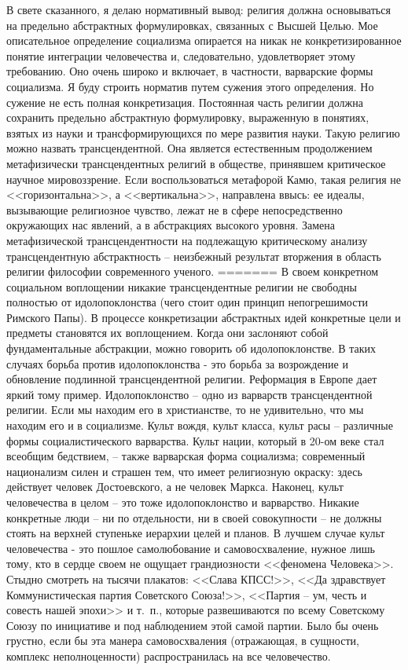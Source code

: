 \documentclass{book}
\begin{document}
В свете сказанного, я делаю нормативный вывод: религия должна основываться на предельно абстрактных формулиров­ках, связанных с Высшей Целью. Мое описательное определе­ние социализма опирается на никак не конкретизированное понятие интеграции человечества и, следовательно, удовлетво­ряет этому требованию. Оно очень широко и включает, в частности, варварские формы социализма. Я буду строить норматив путем сужения этого определения. Но сужение не есть полная конкретизация. Постоянная часть религии должна сохранить предельно абстрактную формулировку, выраженную в понятиях, взятых из науки и трансформирующихся по мере развития науки. Такую религию можно назвать трансцендентной. Она является естественным продолжением метафизически трансцендентных религий в обществе, принявшем критическое научное мировоззрение. Если воспользоваться метафорой Камю, такая религия не <<горизонтальна>>, а <<вертикальна>>, направле­на ввысь: ее идеалы, вызывающие религиозное чувство, лежат не в сфере непосредственно окружающих нас явлений, а в абстракциях высокого уровня. Замена метафизической транс­цендентности на подлежащую критическому анализу трансцендентную абстрактность -- неизбежный результат вторжения в область религии философии современного ученого.
=======
В своем конкретном социальном воплощении никакие транс­цендентные религии не свободны полностью от идолопоклонст­ва (чего стоит один принцип непогрешимости Римского Папы). В процессе конкретизации абстрактных идей конкретные цели и предметы становятся их воплощением. Когда они засло­няют собой фундаментальные абстракции, можно говорить об идолопоклонстве. В таких случаях борьба против идоло­поклонства - это борьба за возрождение и обновление подлин­ной трансцендентной религии. Реформация в Европе дает яркий тому пример. Идолопоклонство -- одно из варварств трансцен­дентной религии. Если мы находим его в христианстве, то не удивительно, что мы находим его и в социализме. Культ вождя, культ класса, культ расы -- различные формы социалистиче­ского варварства. Культ нации, который в 20-ом веке стал всеоб­щим бедствием, -- также варварская форма социализма; совре­менный национализм силен и страшен тем, что имеет религиоз­ную окраску: здесь действует человек Достоевского, а не чело­век Маркса. Наконец, культ 
человечества в целом -- это тоже идолопоклонство и варварство. Никакие конкретные люди -- ни по отдельности, ни в своей совокупности -- не должны стоять на верхней ступеньке иерархии целей и планов. В лучшем слу­чае культ человечества - это пошлое самолюбование и само­восхваление, нужное лишь тому, кто в сердце своем не ощуща­ет грандиозности <<феномена Человека>>. Стыдно смотреть на тысячи плакатов: <<Слава КПСС!>>, <<Да здравствует Коммуни­стическая партия Советского Союза!>>, <<Партия -- ум, честь и совесть нашей эпохи>> и т.~п., которые развешиваются по всему Советскому Союзу по инициативе и под наблюдением этой са­мой партии. Было бы очень грустно, если бы эта манера само­восхваления (отражающая, в сущности, комплекс неполноцен­ности) распространилась на все человечество.
\end{document}
